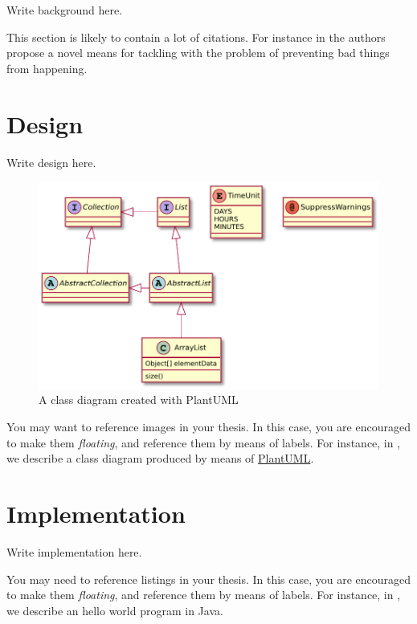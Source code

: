\documentclass[12pt,a4paper,openright,twoside]{book}
\begin{document}
Write background here.

This section is likely to contain a lot of citations.
%
For instance in \cite{AnzengruberSocInfo2013} the authors propose a novel means for tackling with the problem of preventing bad things from happening.

\chapter{Design} %
\label{chap:design}

Write design here.

\begin{figure}
	\centering
	\includegraphics[width=0.5\linewidth]{figures/classes.pdf}
	\caption{A class diagram created with PlantUML}
	\label{fig:classes}
\end{figure}

You may want to reference images in your thesis.
%
In this case, you are encouraged to make them \emph{floating}, and reference them by means of labels.
%
For instance, in , we describe a class diagram produced by means of \href{http://plantuml.com}{PlantUML}.

\chapter{Implementation} %
\label{chap:implementation}

Write implementation here.



You may need to reference listings in your thesis.
%
In this case, you are encouraged to make them \emph{floating}, and reference them by means of labels.
%
For instance, in , we describe an hello world program in Java.
\end{document}

